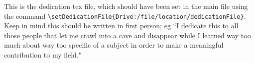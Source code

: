 This is the dedication tex file, which should have been set in the main file using the command \verb|\setDedicationFile{Drive:/file/location/dedicationFile}|. Keep in mind this should be written in first person; eg ``I dedicate this to all those people that let me crawl into a cave and disappear while I learned way too much about way too specific of a subject in order to make a meaningful contribution to my field."
